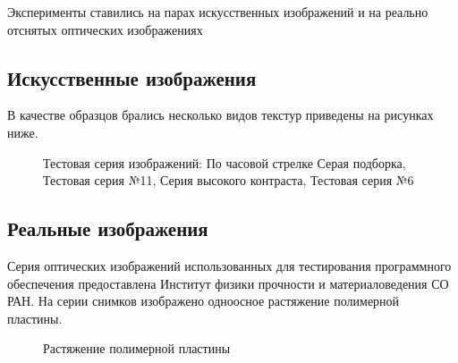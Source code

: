 Эксперименты ставились на парах искусственных изображений и на реально отснятых оптических изображениях

\subsection{Искусственные изображения}

В качестве образцов брались несколько видов текстур приведены на рисунках ниже.

\begin{figure}[ht]
\caption{Тестовая серия изображений: По часовой стрелке Серая подборка, Тестовая серия №11, Серия высокого контраста, Тестовая серия №6}
\label{pic:gray_mix}
\end{figure}

\subsection{Реальные изображения}

Серия оптических изображений использованных для тестирования программного обеспечения предоставлена Институт физики прочности и материаловедения СО РАН. На серии снимков изображено одноосное растяжение полимерной пластины.

\begin{figure}[ht]
\caption{Растяжение полимерной пластины}
\label{pic:real_deform}
\end{figure}
